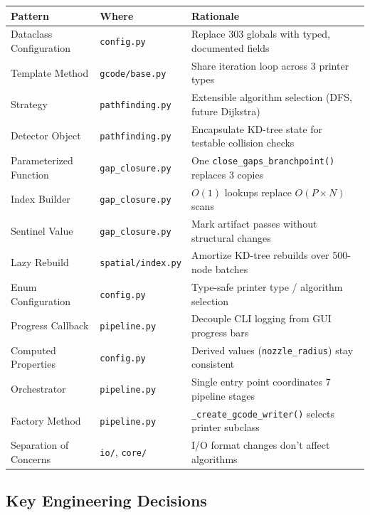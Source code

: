 \documentclass[11pt,a4paper]{article}
\begin{document}
\begin{longtable}{p{4cm}p{3.5cm}p{6.5cm}}
\toprule
\textbf{Pattern} & \textbf{Where} & \textbf{Rationale} \\
\midrule
\endhead
Dataclass Configuration & \texttt{config.py} & Replace 303 globals with typed, documented fields \\
Template Method & \texttt{gcode/base.py} & Share iteration loop across 3 printer types \\
Strategy & \texttt{pathfinding.py} & Extensible algorithm selection (DFS, future Dijkstra) \\
Detector Object & \texttt{pathfinding.py} & Encapsulate KD-tree state for testable collision checks \\
Parameterized Function & \texttt{gap\_closure.py} & One \texttt{close\_gaps\_branchpoint()} replaces 3 copies \\
Index Builder & \texttt{gap\_closure.py} & $O(1)$ lookups replace $O(P \times N)$ scans \\
Sentinel Value & \texttt{gap\_closure.py} & Mark artifact passes without structural changes \\
Lazy Rebuild & \texttt{spatial/index.py} & Amortize KD-tree rebuilds over 500-node batches \\
Enum Configuration & \texttt{config.py} & Type-safe printer type / algorithm selection \\
Progress Callback & \texttt{pipeline.py} & Decouple CLI logging from GUI progress bars \\
Computed Properties & \texttt{config.py} & Derived values (\texttt{nozzle\_radius}) stay consistent \\
Orchestrator & \texttt{pipeline.py} & Single entry point coordinates 7 pipeline stages \\
Factory Method & \texttt{pipeline.py} & \texttt{\_create\_gcode\_writer()} selects printer subclass \\
Separation of Concerns & \texttt{io/}, \texttt{core/} & I/O format changes don't affect algorithms \\
\bottomrule
\end{longtable}

\subsection{Key Engineering Decisions}
\end{document}
